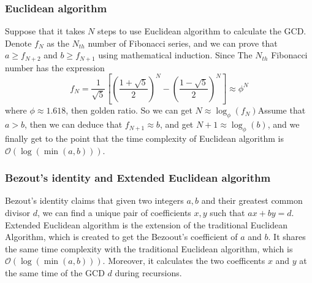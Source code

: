 \documentclass[catalog.tex]{subfiles}
\begin{document}
\subsubsection*{Euclidean algorithm}
Suppose that it takes $N$ steps to use Euclidean algorithm to calculate the GCD. Denote $f_N$ as the $N_{th}$ number of Fibonacci series, and we can prove that $a \geq f_{N+2}$ and $b \geq f_{N+1}$ using mathematical induction. Since The $N_{th}$ Fibonacci number has the expression
$$f_N = \frac{1}{\sqrt{5}}[(\frac{1+\sqrt{5}}{2})^N - (\frac{1-\sqrt{5}}{2})^N] \approx \phi^N$$
where $\phi \approx 1.618$, then golden ratio. So we can get $N \approx \log_\phi(f_N)$Assume that $a>b$, then we can deduce that $f_{N+1} \approx b$, and get $N+1 \approx \log_\phi(b)$, and we finally get to the point that the time complexity of Euclidean algorithm is $\mathcal{O}(\log(\min(a, b)))$.

\begin{Algorithm}[Euclidean\label{alg:\currfilebase_a}]
	\BlankLine

\end{Algorithm}

\newpage

\subsubsection{Bezout's identity and Extended Euclidean algorithm}
Bezout's identity claims that given two integers $a, b$ and their greatest common divisor $d$, we can find a unique pair of coefficients $x, y$ such that $ax+by=d$. Extended Euclidean algorithm is the extension of the traditional Euclidean Algorithm, which is created to get the Bezoout's coefficient of $a$ and $b$. It shares the same time complexity with the traditional Euclidean algorithm, which is $\mathcal{O}(\log(\min(a, b)))$. Moreover, it calculates the two coefficents $x$ and $y$ at the same time of the GCD $d$ during recursions.

\begin{Algorithm}

\end{Algorithm}
\end{document}

